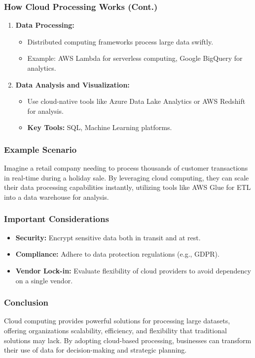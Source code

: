 \documentclass[aspectratio=169]{beamer}
\begin{document}
\begin{frame}[fragile]
    \frametitle{How Cloud Processing Works (Cont.)}
    \begin{enumerate}[resume]
        \item \textbf{Data Processing:}
            \begin{itemize}
                \item Distributed computing frameworks process large data swiftly.
                \item Example: AWS Lambda for serverless computing, Google BigQuery for analytics.
            \end{itemize}
        \item \textbf{Data Analysis and Visualization:}
            \begin{itemize}
                \item Use cloud-native tools like Azure Data Lake Analytics or AWS Redshift for analysis.
                \item \textbf{Key Tools:} SQL, Machine Learning platforms.
            \end{itemize}
    \end{enumerate}
\end{frame}

\begin{frame}[fragile]
    \frametitle{Example Scenario}
    Imagine a retail company needing to process thousands of customer transactions in real-time during a holiday sale. By leveraging cloud computing, they can scale their data processing capabilities instantly, utilizing tools like AWS Glue for ETL into a data warehouse for analysis.
\end{frame}

\begin{frame}[fragile]
    \frametitle{Important Considerations}
    \begin{itemize}
        \item \textbf{Security:} Encrypt sensitive data both in transit and at rest.
        \item \textbf{Compliance:} Adhere to data protection regulations (e.g., GDPR).
        \item \textbf{Vendor Lock-in:} Evaluate flexibility of cloud providers to avoid dependency on a single vendor.
    \end{itemize}
\end{frame}

\begin{frame}[fragile]
    \frametitle{Conclusion}
    Cloud computing provides powerful solutions for processing large datasets, offering organizations scalability, efficiency, and flexibility that traditional solutions may lack. By adopting cloud-based processing, businesses can transform their use of data for decision-making and strategic planning.
\end{frame}
\end{document}
